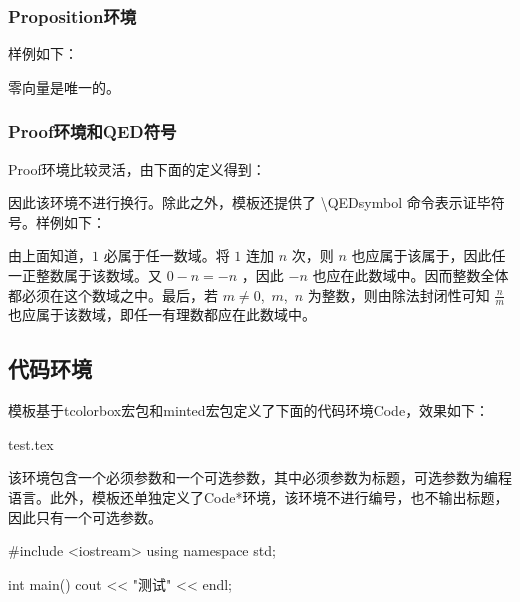 \documentclass{gunote}
\begin{document}
\subsubsection{Proposition环境}
样例如下：
\begin{Proposition}{}{}
  零向量是唯一的。
\end{Proposition}
\subsubsection{Proof环境和QED符号}
\textsf{Proof}环境比较灵活，由下面的定义得到：
\begin{Code*}[latex]
\newcommand{\QEDsymbol}{\hfill$\square$}
\newenvironment{Proof}{\textbf{证：}}{\QEDsymbol} %
\end{Code*}
因此该环境不进行换行。除此之外，模板还提供了 \textsf{\backslash QEDsymbol} 命令表示证毕符号。样例如下：

\begin{Proof}
  由上面知道，$1$ 必属于任一数域。将 $1$ 连加 $n$ 次，则 $n$ 也应属于该属于，因此任一正整数属于该数域。又 $0-n=-n$ ，因此 $-n$ 也应在此数域中。因而整数全体都必须在这个数域之中。最后，若 $m\neq 0$,\ $m$,\ $n$ 为整数，则由除法封闭性可知 $\frac{n}{m}$ 也应属于该数域，即任一有理数都应在此数域中。
\end{Proof}
\subsection{代码环境}
模板基于\textsf{tcolorbox}宏包和\textsf{minted}宏包定义了下面的代码环境\textsf{Code}，效果如下：
\begin{Code}{test.tex}
\end{Code}

该环境包含一个必须参数和一个可选参数，其中必须参数为标题，可选参数为编程语言。此外，模板还单独定义了\textsf{Code*}环境，该环境不进行编号，也不输出标题，因此只有一个可选参数。
\begin{Code*}[cpp]
#include <iostream>
using namespace std;

int main() {
  cout << "测试" << endl;
}
\end{Code*}
\end{document}
